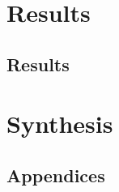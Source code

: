 \part{Results}
\chapter{Results}




\part{Synthesis}



	
\printbibliography
\clearpage



\cleardoublepage
\begin{appendices}
	\chapter{Appendices}







\end{appendices}



